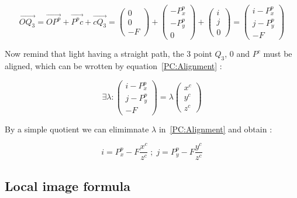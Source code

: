 \begin{equation}
	\overrightarrow{OQ_3} =  \overrightarrow{O P^p} + \overrightarrow{P^p c} +  \overrightarrow{c Q_3}
	 =     \begin{pmatrix} 0\\0\\-F \end{pmatrix}
             + \begin{pmatrix} -P^p_x\\-P^p_y\\0 \end{pmatrix}
             + \begin{pmatrix} i\\j\\0 \end{pmatrix}
	 =     \begin{pmatrix} i-P^p_x\\j-P^p_y\\-F \end{pmatrix}
	\label{PC:Chasles}
\end{equation}

Now remind that light having a straight path, the $3$ point $Q_3$, $0$ and $P^c$ must be aligned,
which can be wrotten by equation~\ref{PC:Alignment} :

\begin{equation}
	\exists \lambda : 
	\begin{pmatrix} i-P^p_x\\j-P^p_y\\-F \end{pmatrix} 
      = \lambda   \begin{pmatrix} x^c\\y^c\\z^c \end{pmatrix}
		\label{PC:Alignment}
\end{equation}

By a simple quotient  we can elimimnate $\lambda$ in~\ref{PC:Alignment} and obtain :


\begin{equation}
	i = P^p_x -F \frac{x^c}{z^c}  \; ; \;
	j = P^p_y -F \frac{y^c}{z^c}  
	\label{PC:FormulaImaIntr1}
\end{equation}

\subsection{Local image formula}

